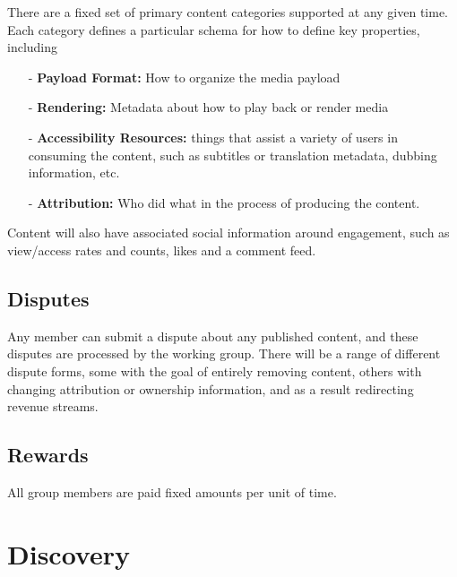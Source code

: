 \documentclass{article}
\begin{document}
There are a fixed set of primary content categories supported at any given time. Each category defines a particular schema for how to define key properties, including

\begin{itemize}

    \item[-] \textbf{Payload Format:} How to organize the media payload

    \item[-] \textbf{Rendering:} Metadata about how to play back or render media

    \item[-] \textbf{Accessibility Resources:} things that assist a variety of users in consuming the content, such as subtitles or translation metadata, dubbing information, etc.

    \item[-] \textbf{Attribution:} Who did what in the process of producing the content.

\end{itemize}

Content will also have associated social information around engagement, such as view/access rates and counts, likes and a comment feed.

\subsection{Disputes}

Any member can submit a dispute about any published content, and these disputes are processed by the working group. There will be a range of different dispute forms, some with the goal of entirely removing content, others with changing attribution or ownership information, and as a result redirecting revenue streams.


\subsection{Rewards}

All group members are paid fixed amounts per unit of time.

\section{Discovery}
\end{document}
